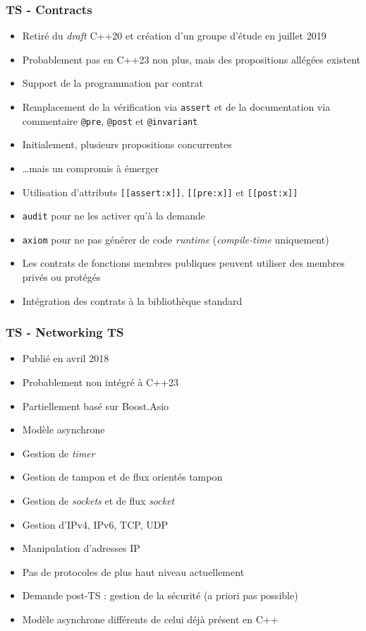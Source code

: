 \documentclass[C++.tex]{subfiles}
\begin{document}
\begin{frame}[fragile]
	\frametitle{TS - Contracts}
	\begin{itemize}
		\item Retiré du \textit{draft} C++20 et création d'un groupe d'étude en juillet 2019
		\item Probablement pas en C++23 non plus, mais des propositions allégées existent


		\item Support de la programmation par contrat
		\item Remplacement de la vérification via \lstinline|assert| et de la documentation via commentaire \lstinline|@pre|, \lstinline|@post| et \lstinline|@invariant|
		\item Initialement, plusieurs propositions \og concurrentes\fg{}
		\item \ldots{}mais un compromis à émerger
		\item Utilisation d'attributs \lstinline|[[assert:x]]|, \lstinline|[[pre:x]]| et \lstinline|[[post:x]]|


		\item \lstinline|audit| pour ne les activer qu'à la demande
		\item \lstinline|axiom| pour ne pas générer de code \textit{runtime} (\textit{compile-time} uniquement)
		\item Les contrats de fonctions membres publiques peuvent utiliser des membres privés ou protégés
		\item Intégration des contrats à la bibliothèque standard
	\end{itemize}
\end{frame}

\begin{frame}
	\frametitle{TS - Networking TS}
	\begin{itemize}
		\item Publié en avril 2018
		\item Probablement non intégré à C++23
		\item Partiellement basé sur Boost.Asio
		\item Modèle asynchrone
		\item Gestion de \textit{timer}
		\item Gestion de tampon et de flux orientés tampon
		\item Gestion de \textit{sockets} et de flux \og \textit{socket}\fg{}
		\item Gestion d'IPv4, IPv6, TCP, UDP
		\item Manipulation d'adresses IP
		\item Pas de protocoles de plus haut niveau actuellement
		\item Demande post-TS : gestion de la sécurité (a priori pas possible)
		\item Modèle asynchrone différents de celui déjà présent en C++
	\end{itemize}
\end{frame}
\end{document}
